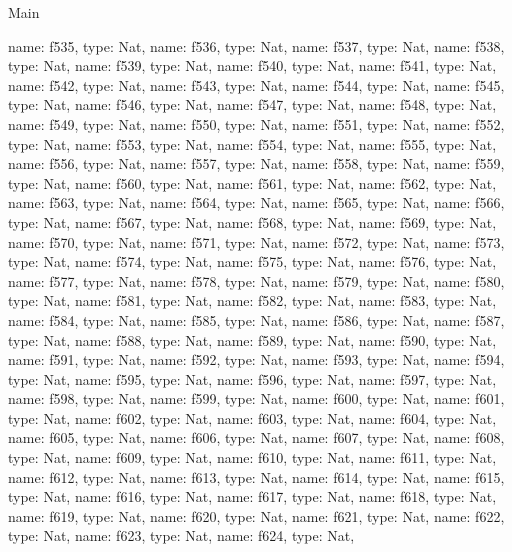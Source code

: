 \begin{lexlean}{Main}
\begin{semanticmodule}
{    {name: f535, type: Nat},
    {name: f536, type: Nat},
    {name: f537, type: Nat},
    {name: f538, type: Nat},
    {name: f539, type: Nat},
    {name: f540, type: Nat},
    {name: f541, type: Nat},
    {name: f542, type: Nat},
    {name: f543, type: Nat},
    {name: f544, type: Nat},
    {name: f545, type: Nat},
    {name: f546, type: Nat},
    {name: f547, type: Nat},
    {name: f548, type: Nat},
    {name: f549, type: Nat},
    {name: f550, type: Nat},
    {name: f551, type: Nat},
    {name: f552, type: Nat},
    {name: f553, type: Nat},
    {name: f554, type: Nat},
    {name: f555, type: Nat},
    {name: f556, type: Nat},
    {name: f557, type: Nat},
    {name: f558, type: Nat},
    {name: f559, type: Nat},
    {name: f560, type: Nat},
    {name: f561, type: Nat},
    {name: f562, type: Nat},
    {name: f563, type: Nat},
    {name: f564, type: Nat},
    {name: f565, type: Nat},
    {name: f566, type: Nat},
    {name: f567, type: Nat},
    {name: f568, type: Nat},
    {name: f569, type: Nat},
    {name: f570, type: Nat},
    {name: f571, type: Nat},
    {name: f572, type: Nat},
    {name: f573, type: Nat},
    {name: f574, type: Nat},
    {name: f575, type: Nat},
    {name: f576, type: Nat},
    {name: f577, type: Nat},
    {name: f578, type: Nat},
    {name: f579, type: Nat},
    {name: f580, type: Nat},
    {name: f581, type: Nat},
    {name: f582, type: Nat},
    {name: f583, type: Nat},
    {name: f584, type: Nat},
    {name: f585, type: Nat},
    {name: f586, type: Nat},
    {name: f587, type: Nat},
    {name: f588, type: Nat},
    {name: f589, type: Nat},
    {name: f590, type: Nat},
    {name: f591, type: Nat},
    {name: f592, type: Nat},
    {name: f593, type: Nat},
    {name: f594, type: Nat},
    {name: f595, type: Nat},
    {name: f596, type: Nat},
    {name: f597, type: Nat},
    {name: f598, type: Nat},
    {name: f599, type: Nat},
    {name: f600, type: Nat},
    {name: f601, type: Nat},
    {name: f602, type: Nat},
    {name: f603, type: Nat},
    {name: f604, type: Nat},
    {name: f605, type: Nat},
    {name: f606, type: Nat},
    {name: f607, type: Nat},
    {name: f608, type: Nat},
    {name: f609, type: Nat},
    {name: f610, type: Nat},
    {name: f611, type: Nat},
    {name: f612, type: Nat},
    {name: f613, type: Nat},
    {name: f614, type: Nat},
    {name: f615, type: Nat},
    {name: f616, type: Nat},
    {name: f617, type: Nat},
    {name: f618, type: Nat},
    {name: f619, type: Nat},
    {name: f620, type: Nat},
    {name: f621, type: Nat},
    {name: f622, type: Nat},
    {name: f623, type: Nat},
    {name: f624, type: Nat},
}
\end{semanticmodule}
\end{lexlean}
